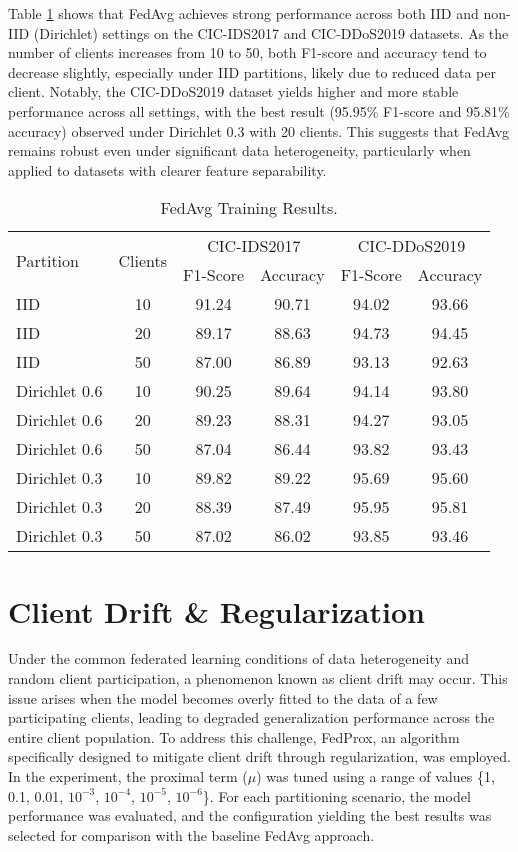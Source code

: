 Table \ref{tbl:fedavg_results} shows that FedAvg achieves strong performance across both IID and non-IID (Dirichlet) settings on the CIC-IDS2017 and CIC-DDoS2019 datasets. As the number of clients increases from 10 to 50, both F1-score and accuracy tend to decrease slightly, especially under IID partitions, likely due to reduced data per client. Notably, the CIC-DDoS2019 dataset yields higher and more stable performance across all settings, with the best result (95.95\% F1-score and 95.81\% accuracy) observed under Dirichlet 0.3 with 20 clients. This suggests that FedAvg remains robust even under significant data heterogeneity, particularly when applied to datasets with clearer feature separability.

\begin{table}[h]
    \caption{FedAvg Training Results.}
    \centering
    \begin{tabular}{l|c|c|c|c|c}
        \multirow{2}{*}{Partition} & \multirow{2}{*}{Clients} & \multicolumn{2}{|c|}{CIC-IDS2017} & \multicolumn{2}{|c}{CIC-DDoS2019} \\
        \cline{3-6} & & F1-Score & Accuracy & F1-Score & Accuracy \\
        \hline\hline
        IID & 10 & 91.24 & 90.71 & 94.02 & 93.66 \\
        IID & 20 & 89.17 & 88.63 & 94.73 & 94.45 \\
        IID & 50 & 87.00 & 86.89 & 93.13 & 92.63 \\
        Dirichlet 0.6 & 10 & 90.25 & 89.64 & 94.14 & 93.80 \\
        Dirichlet 0.6 & 20 & 89.23 & 88.31 & 94.27 & 93.05 \\
        Dirichlet 0.6 & 50 & 87.04 & 86.44 & 93.82 & 93.43 \\
        Dirichlet 0.3 & 10 & 89.82 & 89.22 & 95.69 & 95.60 \\
        Dirichlet 0.3 & 20 & 88.39 & 87.49 & 95.95 & 95.81 \\
        Dirichlet 0.3 & 50 & 87.02 & 86.02 & 93.85 & 93.46 \\
    \end{tabular}
    \label{tbl:fedavg_results}
\end{table}


\section{Client Drift \& Regularization}

Under the common federated learning conditions of data heterogeneity and random client participation, a phenomenon known as client drift may occur. This issue arises when the model becomes overly fitted to the data of a few participating clients, leading to degraded generalization performance across the entire client population. To address this challenge, FedProx, an algorithm specifically designed to mitigate client drift through regularization, was employed. In the experiment, the proximal term ($\mu$) was tuned using a range of values \{1, 0.1, 0.01, $10^{-3}$, $10^{-4}$, $10^{-5}$, $10^{-6}$\}. For each partitioning scenario, the model performance was evaluated, and the configuration yielding the best results was selected for comparison with the baseline FedAvg approach.

